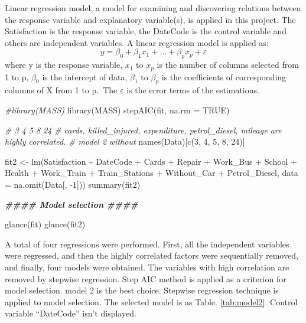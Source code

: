 \documentclass[
]{article}
\newenvironment{Shaded}{\begin{snugshade}}{\end{snugshade}}
\newcommand{\AttributeTok}[1]{\textcolor[rgb]{0.77,0.63,0.00}{#1}}
\newcommand{\CommentTok}[1]{\textcolor[rgb]{0.56,0.35,0.01}{\textit{#1}}}
\newcommand{\ConstantTok}[1]{\textcolor[rgb]{0.00,0.00,0.00}{#1}}
\newcommand{\DecValTok}[1]{\textcolor[rgb]{0.00,0.00,0.81}{#1}}
\newcommand{\DocumentationTok}[1]{\textcolor[rgb]{0.56,0.35,0.01}{\textbf{\textit{#1}}}}
\newcommand{\FunctionTok}[1]{\textcolor[rgb]{0.00,0.00,0.00}{#1}}
\newcommand{\NormalTok}[1]{#1}
\newcommand{\OtherTok}[1]{\textcolor[rgb]{0.56,0.35,0.01}{#1}}
\newcommand{\SpecialCharTok}[1]{\textcolor[rgb]{0.00,0.00,0.00}{#1}}
\begin{document}
Linear regression model, a model for examining and discovering relations
between the response variable and explanatory variable(s), is applied in
this project. The Satisfaction is the response variable, the DateCode is
the control variable and others are independent variables. A linear
regression model is applied as:
\[y=\beta_0+\beta_1x_1+\dots+\beta_px_p+\varepsilon \] where y is the
response variable, \(x_1\) to \(x_p\) is the number of columns selected
from 1 to p, \(\beta_0\) is the intercept of data, \(\beta_1\) to
\(\beta_p\) is the coefficients of corresponding columns of X from 1 to
p.~The \(\varepsilon\) is the error terms of the estimations.

\begin{Shaded}
\begin{Highlighting}[]
\CommentTok{\#library(MASS)}
\FunctionTok{library}\NormalTok{(MASS)}
\FunctionTok{stepAIC}\NormalTok{(fit, }\AttributeTok{na.rm =} \ConstantTok{TRUE}\NormalTok{)}

\CommentTok{\# 3 4 5 8 24}
\CommentTok{\# cards, killed\_injured, expenditure, petrol\_diesel, mileage are highly correlated.}
\CommentTok{\# model 2 without}
\FunctionTok{names}\NormalTok{(Data)[}\FunctionTok{c}\NormalTok{(}\DecValTok{3}\NormalTok{, }\DecValTok{4}\NormalTok{, }\DecValTok{5}\NormalTok{, }\DecValTok{8}\NormalTok{, }\DecValTok{24}\NormalTok{)]}

\NormalTok{fit2 }\OtherTok{\textless{}{-}} \FunctionTok{lm}\NormalTok{(Satisfaction }\SpecialCharTok{\textasciitilde{}}\NormalTok{ DateCode }\SpecialCharTok{+}\NormalTok{ Cards }\SpecialCharTok{+}\NormalTok{ Repair }\SpecialCharTok{+}\NormalTok{ Work\_Bus }\SpecialCharTok{+} 
\NormalTok{             School }\SpecialCharTok{+}\NormalTok{ Health }\SpecialCharTok{+}\NormalTok{ Work\_Train }\SpecialCharTok{+}\NormalTok{ Train\_Stations }\SpecialCharTok{+}\NormalTok{ Without\_Car }\SpecialCharTok{+} 
\NormalTok{             Petrol\_Diesel, }\AttributeTok{data =} \FunctionTok{na.omit}\NormalTok{(Data[, }\SpecialCharTok{{-}}\DecValTok{1}\NormalTok{]))}
\FunctionTok{summary}\NormalTok{(fit2)}

\DocumentationTok{\#\#\#\# Model selection \#\#\#\#}

\FunctionTok{glance}\NormalTok{(fit)}
\FunctionTok{glance}\NormalTok{(fit2)}
\end{Highlighting}
\end{Shaded}

A total of four regressions were performed. First, all the independent
variables were regressed, and then the highly correlated factors were
sequentially removed, and finally, four models were obtained. The
variables with high correlation are removed by stepwise regression. Step
AIC method is applied as a criterion for model selection. model 2 is the
best choice. Stepwise regression technique is applied to model
selection. The selected model is as Table. \ref{tab:model2}. Control
variable ``DateCode'' isn't displayed.
\end{document}
